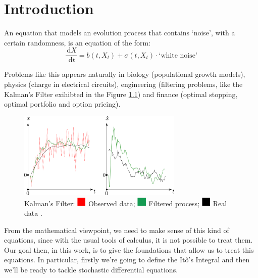 \chapter{Introduction}


An equation that models an evolution process that contains `noise', with a certain randomness, is an equation of the form:
\begin{equation}\label{eq:sde}
	\frac{\, \mathrm{d}X}{\, \mathrm{d}t} = b(t,X_t) + \sigma(t,X_t)\cdot \text{`white noise'}
\end{equation}

Problems like this appears naturally in biology (populational growth models), physics (charge in electrical circuits), engineering (filtering problems, like the Kalman's Filter exihibted in the Figure \ref{fig:kalman}) and finance (optimal stopping, optimal portfolio and option pricing).

\begin{figure}[H]
  \centering
    \includegraphics[width=0.7\textwidth]{Figures/Kalman.png} 
    \caption{Kalman's Filter: $\crule[red]{0.4cm}{0.4cm}$ Observed data; $\crule[ForestGreen]{0.4cm}{0.4cm}$ Filtered process; $\crule{0.4cm}{0.4cm}$ Real data \cite{wiki:Kalman_filter}.}
    \label{fig:kalman}
\end{figure}

From the mathematical viewpoint, we need to make sense of this kind of equations, since with the usual tools of calculus, it is not possible to treat them. Our goal then, in this work, is to give the foundations that allow us to treat this equations. In particular, firstly we're going to define the Itô's Integral and then we'll be ready to tackle stochastic differential equations.